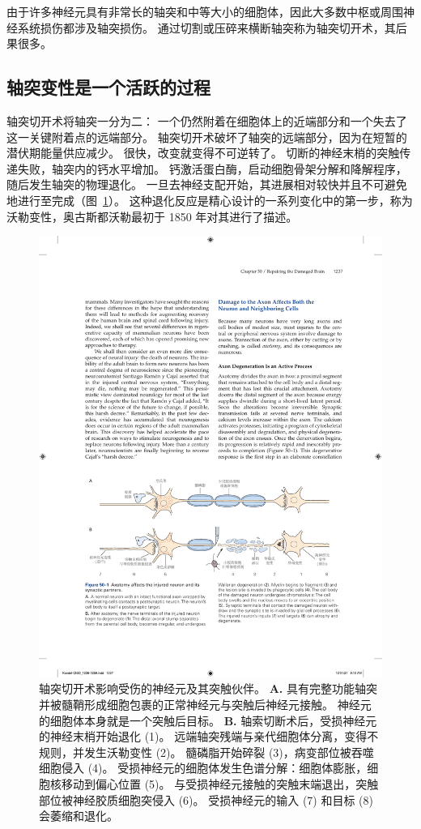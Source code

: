 由于许多神经元具有非常长的轴突和中等大小的细胞体，因此大多数中枢或周围神经系统损伤都涉及轴突损伤。
通过切割或压碎来横断轴突称为轴突切开术，其后果很多。


\subsection{轴突变性是一个活跃的过程}

轴突切开术将轴突一分为二：
一个仍然附着在细胞体上的近端部分和一个失去了这一关键附着点的远端部分。
轴突切开术破坏了轴突的远端部分，因为在短暂的潜伏期能量供应减少。
很快，改变就变得不可逆转了。
切断的神经末梢的突触传递失败，轴突内的钙水平增加。
钙激活蛋白酶，启动细胞骨架分解和降解程序，随后发生轴突的物理退化。
一旦去神经支配开始，其进展相对较快并且不可避免地进行至完成（图~\ref{fig:50_1}）。
这种退化反应是精心设计的一系列变化中的第一步，称为沃勒变性，奥古斯都沃勒最初于 1850 年对其进行了描述。


\begin{figure}[htbp]
	\centering
	\includegraphics[width=1.0\linewidth]{chap50/fig_50_1}
	\caption{轴突切开术影响受伤的神经元及其突触伙伴。
		\textbf{A.} 具有完整功能轴突并被髓鞘形成细胞包裹的正常神经元与突触后神经元接触。
		神经元的细胞体本身就是一个突触后目标。
		\textbf{B.} 轴索切断术后，受损神经元的神经末梢开始退化 (1)。
		远端轴突残端与亲代细胞体分离，变得不规则，并发生沃勒变性 (2)。
		髓磷脂开始碎裂 (3)，病变部位被吞噬细胞侵入 (4)。
		受损神经元的细胞体发生色谱分解：细胞体膨胀，细胞核移动到偏心位置 (5)。
		与受损神经元接触的突触末端退出，突触部位被神经胶质细胞突侵入 (6)。
		受损神经元的输入 (7) 和目标 (8) 会萎缩和退化。}
	\label{fig:50_1}
\end{figure}


